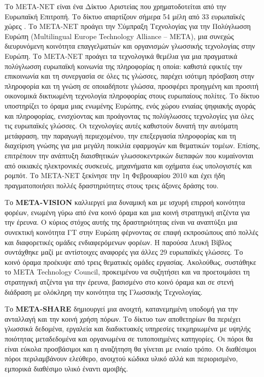 \begin{multicols}{2}
   Το META-NET είναι ένα Δίκτυο Αριστείας που χρηματοδοτείται από την Ευρωπαϊκή Επιτροπή. Το δίκτυο απαρτίζουν σήμερα 54 μέλη από 33 ευρωπαϊκές χώρες \cite{rehm2011}. Το META-NET προάγει την Σύμπραξη Τεχνολογίας για την Πολύγλωσση Ευρώπη (Multilingual Europe Technology Alliance -- META), μια συνεχώς διευρυνόμενη κοινότητα επαγγελματιών και οργανισμών γλωσσικής τεχνολογίας στην Ευρώπη. Το META-NET προάγει τα τεχνολογικά θεμέλια για μια πραγματικά πολύγλωσση ευρωπαϊκή κοινωνία της πληροφορίας η οποία: καθιστά εφικτές την επικοινωνία και τη συνεργασία σε όλες τις γλώσσες, παρέχει ισότιμη πρόσβαση στην πληροφορία και τη γνώση σε οποιαδήποτε γλώσσα, προσφέρει προηγμένη και προσιτή οικονομικά δικτυωμένη τεχνολογία πληροφορίας στους ευρωπαίους πολίτες.
%
Το δίκτυο υποστηρίζει το  όραμα μιας ενωμένης Ευρώπης, ενός χώρου ενιαίας ψηφιακής αγοράς και πληροφορίας, ενισχύοντας και προάγοντας τις πολύγλωσσες τεχνολογίες για όλες τις ευρωπαϊκές γλώσσες. Οι τεχνολογίες αυτές καθιστούν δυνατή την αυτόματη μετάφραση, την παραγωγή περιεχομένου, την επεξεργασία πληροφορίας και τη διαχείριση γνώσης για μια μεγάλη ποικιλία εφαρμογών και θεματικών τομέων. Επίσης, επιτρέπουν την ανάπτυξη διαισθητικών γλωσσοκεντρικών διεπαφών που κυμαίνονται από οικιακές ηλεκτρονικές συσκευές, μηχανήματα και οχήματα έως υπολογιστές και ρομπότ. Το META-NET ξεκίνησε την 1η Φεβρουαρίου 2010 και έχει ήδη πραγματοποιήσει πολλές δραστηριότητες στους τρεις άξονες δράσης του. 

Το \textbf{META-VISION} καλλιεργεί μια δυναμική και με ισχυρή επιρροή κοινότητα φορέων, ενωμένη γύρω από ένα κοινό όραμα και μια κοινή στρατηγική ατζέντα για την έρευνα. Ο κύριος στόχος αυτής της δραστηριότητας είναι να αναπτύξει μια συνεκτική κοινότητα ΓΤ στην Ευρώπη φέρνοντας σε επαφή εκπροσώπους από πολλές και διαφορετικές ομάδες ενδιαφερόμενων φορέων. Η παρούσα Λευκή Βίβλος συντάχθηκε μαζί με αντίστοιχες αναφορές για άλλες 29 ευρωπαϊκές γλώσσες. Το κοινό όραμα προέκυψε από τρεις θεματικές ομάδες εργασίας. Ακολούθως, συστάθηκε το META Technology Council, προκειμένου να συζητήσει και να προετοιμάσει τη στρατηγική ατζέντα για την έρευνα, βασισμένο στο κοινό όραμα και σε στενή διάδραση με ολόκληρη την κοινότητα της Γλωσσικής Τεχνολογίας.

Το \textbf{META-SHARE} δημιουργεί μια ανοιχτή, κατανεμημένη υποδομή για την ανταλλαγή και την κοινή χρήση πόρων. Το δίκτυο των αποθετηρίων θα περιέχει γλωσσικά δεδομένα, εργαλεία και διαδικτυακές υπηρεσίες τεκμηριωμένα με υψηλής ποιότητας μεταδεδομένα και οργανωμένα σε τυποποιημένες κατηγορίες. Οι πόροι θα είναι εύκολα προσβάσιμοι και η αναζήτηση θα γίνεται με ενιαίο τρόπο. Οι διαθέσιμοι πόροι περιλαμβάνουν ελεύθερο, ανοιχτού κώδικα υλικό αλλά και περιορισμένο, εμπορικά διαθέσιμο υλικό έναντι αμοιβής.


\end{multicols}

